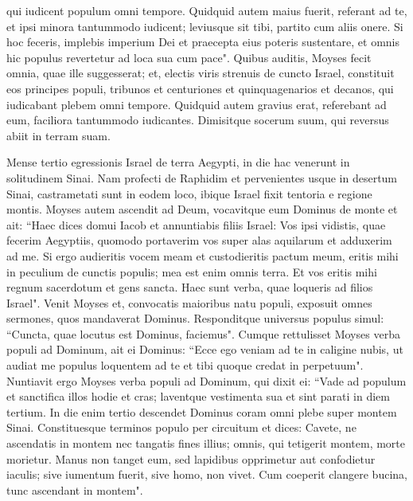 \begin{biblechapter}
\verse qui iudicent populum omni tempore. Quidquid autem maius fuerit, referant ad te, et ipsi minora tantummodo iudicent; leviusque sit tibi, partito cum aliis onere. 
\verse Si hoc feceris, implebis imperium Dei et praecepta eius poteris sustentare, et omnis hic populus revertetur ad loca sua cum pace". 
\verse Quibus auditis, Moyses fecit omnia, quae ille suggesserat; 
\verse et, electis viris strenuis de cuncto Israel, constituit eos principes populi, tribunos et centuriones et quinquagenarios et decanos, 
\verse qui iudicabant plebem omni tempore. Quidquid autem gravius erat, referebant ad eum, faciliora tantummodo iudicantes. 
\verse Dimisitque socerum suum, qui reversus abiit in terram suam. 
\end{biblechapter}

\begin{biblechapter}  
\verse Mense tertio egressionis Israel de terra Aegypti, in die hac venerunt in solitudinem Sinai. 
\verse Nam profecti de Raphidim et pervenientes usque in desertum Sinai, castrametati sunt in eodem loco, ibique Israel fixit tentoria e regione montis. 
\verse Moyses autem ascendit ad Deum, vocavitque eum Dominus de monte et ait: “Haec dices domui Iacob et annuntiabis filiis Israel: 
\verse Vos ipsi vidistis, quae fecerim Aegyptiis, quomodo portaverim vos super alas aquilarum et adduxerim ad me. 
\verse Si ergo audieritis vocem meam et custodieritis pactum meum, eritis mihi in peculium de cunctis populis; mea est enim omnis terra. 
\verse Et vos eritis mihi regnum sacerdotum et gens sancta. Haec sunt verba, quae loqueris ad filios Israel". 
\verse Venit Moyses et, convocatis maioribus natu populi, exposuit omnes sermones, quos mandaverat Dominus. 
\verse Responditque universus populus simul: “Cuncta, quae locutus est Dominus, faciemus". Cumque rettulisset Moyses verba populi ad Dominum, 
\verse ait ei Dominus: “Ecce ego veniam ad te in caligine nubis, ut audiat me populus loquentem ad te et tibi quoque credat in perpetuum". Nuntiavit ergo Moyses verba populi ad Dominum, 
\verse qui dixit ei: “Vade ad populum et sanctifica illos hodie et cras; laventque vestimenta sua 
\verse et sint parati in diem tertium. In die enim tertio descendet Dominus coram omni plebe super montem Sinai. 
\verse Constituesque terminos populo per circuitum et dices: Cavete, ne ascendatis in montem nec tangatis fines illius; omnis, qui tetigerit montem, morte morietur. 
\verse Manus non tanget eum, sed lapidibus opprimetur aut confodietur iaculis; sive iumentum fuerit, sive homo, non vivet. Cum coeperit clangere bucina, tunc ascendant in montem". 

\end{biblechapter}

